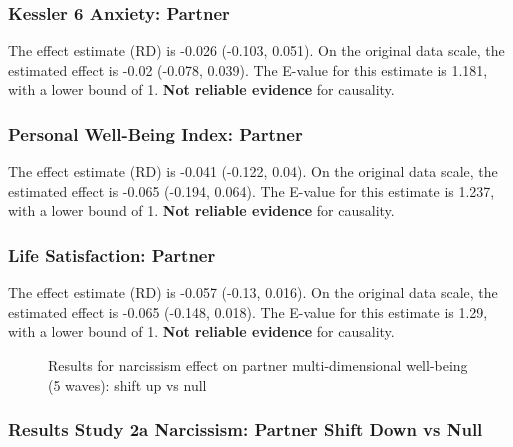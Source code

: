 \documentclass[
  singlecolumn]{article}
\begin{document}
\subsubsection{Kessler 6 Anxiety:
Partner}\label{kessler-6-anxiety-partner-15}

The effect estimate (RD) is -0.026 (-0.103, 0.051). On the original data
scale, the estimated effect is -0.02 (-0.078, 0.039). The E-value for
this estimate is 1.181, with a lower bound of 1. \textbf{Not reliable
evidence} for causality.

\subsubsection{Personal Well-Being Index:
Partner}\label{personal-well-being-index-partner-15}

The effect estimate (RD) is -0.041 (-0.122, 0.04). On the original data
scale, the estimated effect is -0.065 (-0.194, 0.064). The E-value for
this estimate is 1.237, with a lower bound of 1. \textbf{Not reliable
evidence} for causality.

\subsubsection{Life Satisfaction:
Partner}\label{life-satisfaction-partner-15}

The effect estimate (RD) is -0.057 (-0.13, 0.016). On the original data
scale, the estimated effect is -0.065 (-0.148, 0.018). The E-value for
this estimate is 1.29, with a lower bound of 1. \textbf{Not reliable
evidence} for causality.

\begin{figure}


\caption{\label{fig-results-narcissism-partner-up-long}Results for
narcissism effect on partner multi-dimensional well-being (5 waves):
shift up vs null}

\end{figure}%

\newpage{}

\subsubsection{Results Study 2a Narcissism: Partner Shift Down vs
Null}\label{results-study-2a-narcissism-partner-shift-down-vs-null}
\end{document}
